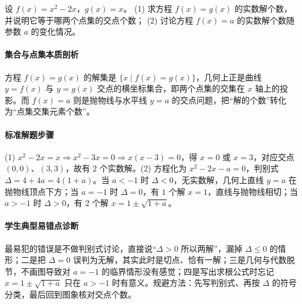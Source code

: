 \begin{problem}
设 $f(x)=x^2-2x$，$g(x)=x$。
(1) 求方程 $f(x)=g(x)$ 的实数解个数，并说明它等于哪两个点集的交点个数；
(2) 讨论方程 $f(x)=a$ 的实数解个数随参数 $a$ 的变化情况。
\end{problem}
\begin{solution}
\paragraph{集合与点集本质剖析}
方程 $f(x)=g(x)$ 的解集是 $\{x\mid f(x)=g(x)\}$，几何上正是曲线 $y=f(x)$ 与 $y=g(x)$ 交点的横坐标集合，即两个点集的交集在 $x$ 轴上的投影。而 $f(x)=a$ 则是抛物线与水平线 $y=a$ 的交点问题，把“解的个数”转化为“点集交集元素个数”。
\paragraph{标准解题步骤}
(1) $x^2-2x=x\Rightarrow x^2-3x=0\Rightarrow x(x-3)=0$，得 $x=0$ 或 $x=3$，对应交点 $(0,0)$、$(3,3)$，故有 $2$ 个实数解。(2) 方程化为 $x^2-2x-a=0$，判别式 $\Delta=4+4a=4(1+a)$。当 $a<-1$ 时 $\Delta<0$，无实数解，几何上直线 $y=a$ 在抛物线顶点下方；当 $a=-1$ 时 $\Delta=0$，有 $1$ 个解 $x=1$，直线与抛物线相切；当 $a>-1$ 时 $\Delta>0$，有 $2$ 个解 $x=1\pm\sqrt{1+a}$。
\paragraph{学生典型易错点诊断}
最易犯的错误是不做判别式讨论，直接说“$\Delta>0$ 所以两解”，漏掉 $\Delta\leq0$ 的情形；二是把 $\Delta=0$ 误判为无解，其实此时是切点、恰有一解；三是几何与代数脱节，不画图导致对 $a=-1$ 的临界情形没有感觉；四是写出求根公式时忘记 $x=1\pm\sqrt{1+a}$ 只在 $a>-1$ 时有意义。规避方法：先写判别式、再按 $\Delta$ 的符号分类，最后回到图象核对交点个数。
\end{solution}

